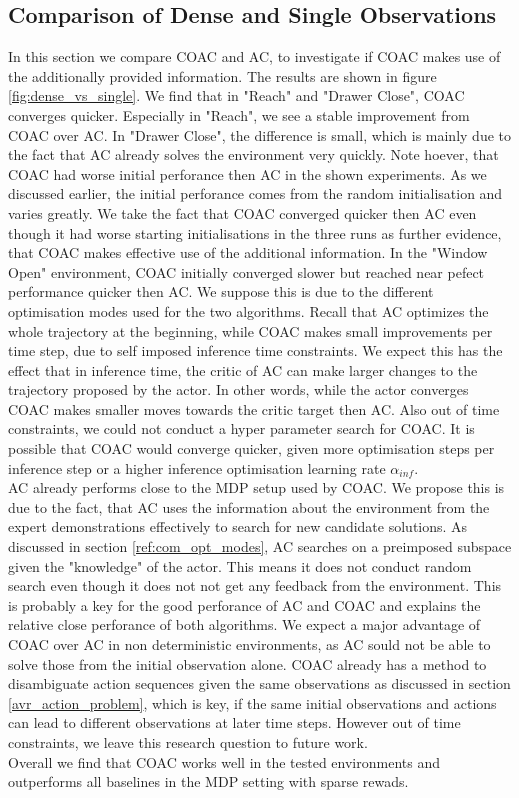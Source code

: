 \subsection{Comparison of Dense and Single Observations}
\label{sec:comp_dense_sparse}
In this section we compare COAC and AC, to investigate if COAC makes use of the additionally provided information. The results are shown in figure \ref{fig:dense_vs_single}.
We find that in "Reach" and "Drawer Close", COAC converges quicker. Especially in "Reach", we see a stable improvement from COAC over AC. In "Drawer Close", the difference is 
small, which is mainly due to the fact that AC already solves the environment very quickly. Note hoever, that COAC had worse initial perforance then AC in the shown experiments. 
As we discussed earlier, the initial perforance comes from the random initialisation and varies greatly. We take the fact that COAC converged quicker then AC even though it had 
worse starting initialisations in the three runs as further evidence, that COAC makes effective use of the additional information. In the "Window Open" environment, COAC initially converged slower but 
reached near pefect performance quicker then AC. We suppose this is due to the different optimisation modes used for the two algorithms. Recall that AC optimizes the whole 
trajectory at the beginning, while COAC makes small improvements per time step, due to self imposed inference time constraints. We expect this has the effect that in inference time, the critic of 
AC can make larger changes to the trajectory proposed by the actor. In other words, while the actor converges COAC makes smaller moves towards the critic target then AC. Also out of time constraints, we could 
not conduct a hyper parameter search for COAC. It is possible that COAC would converge quicker, given more optimisation steps per inference step or a higher inference optimisation 
learning rate $\alpha_{inf}$.\\ 
AC already performs close to the MDP setup used by COAC. We propose this is due to the fact, that AC uses the information about the environment 
from the expert demonstrations effectively to search for new candidate solutions. As discussed in section \ref{ref:com_opt_modes}, AC searches on a preimposed subspace given the "knowledge" of the 
actor. This means it does not conduct random search even though it does not not get any feedback from the environment. This is probably a key for the good perforance of AC and COAC and explains 
the relative close perforance of both algorithms. We expect a major advantage of COAC over AC in non deterministic environments, as AC sould not be able to solve those from the initial 
observation alone. COAC already has a method to disambiguate action sequences given the same observations as discussed in section \ref{avr_action_problem}, which is key, if the same initial 
observations and actions can lead to different observations at later time steps. However out of time constraints, we leave this research question to future work.\\
Overall we find that COAC works well in the tested environments and outperforms all baselines in the MDP setting with sparse rewads.

